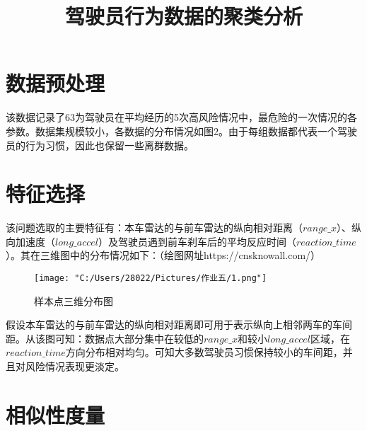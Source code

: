 \documentclass[withoutpreface,bwprint]{cumcmthesis}
\title{\textbf{驾驶员行为数据的聚类分析}}
\begin{document}
\maketitle

\section{数据预处理}
该数据记录了63为驾驶员在平均经历的5次高风险情况中，最危险的一次情况的各参数。数据集规模较小，各数据的分布情况如图2。由于每组数据都代表一个驾驶员的行为习惯，因此也保留一些离群数据。
\section{特征选择}
该问题选取的主要特征有：本车雷达的与前车雷达的纵向相对距离（$range\_x$）、纵向加速度（$long\_accel$）及驾驶员遇到前车刹车后的平均反应时间（$reaction\_time$）。其在三维图中的分布情况如下：（绘图网址https://cnsknowall.com/）\par
\begin{figure}[!htbp] 
    \centering
    \texttt{[image: "C:/Users/28022/Pictures/作业五/1.png"]} 
    \caption{样本点三维分布图} 
    \label{fig:example} 
\end{figure}
假设本车雷达的与前车雷达的纵向相对距离即可用于表示纵向上相邻两车的车间距。从该图可知：数据点大部分集中在较低的$range\_x$和较小$long\_accel$区域，在$reaction\_time$方向分布相对均匀。可知大多数驾驶员习惯保持较小的车间距，并且对风险情况表现更淡定。

\section{相似性度量}
\end{document}
